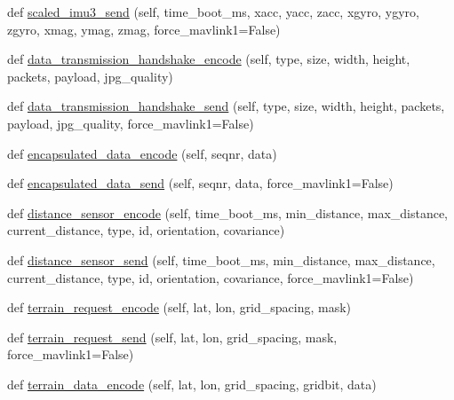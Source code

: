 \begin{DoxyCompactItemize}
\item 
def \hyperlink{classpymavlink_1_1dialects_1_1v10_1_1MAVLink_a28894d493bf265c31ad3fb4b7be9fd78}{scaled\+\_\+imu3\+\_\+send} (self, time\+\_\+boot\+\_\+ms, xacc, yacc, zacc, xgyro, ygyro, zgyro, xmag, ymag, zmag, force\+\_\+mavlink1=False)
\item 
def \hyperlink{classpymavlink_1_1dialects_1_1v10_1_1MAVLink_a57a74e2dec63d844409f787d2d19f21d}{data\+\_\+transmission\+\_\+handshake\+\_\+encode} (self, type, size, width, height, packets, payload, jpg\+\_\+quality)
\item 
def \hyperlink{classpymavlink_1_1dialects_1_1v10_1_1MAVLink_ac53be48c97d9cd12e5d0b5b6d0b3bd8c}{data\+\_\+transmission\+\_\+handshake\+\_\+send} (self, type, size, width, height, packets, payload, jpg\+\_\+quality, force\+\_\+mavlink1=False)
\item 
def \hyperlink{classpymavlink_1_1dialects_1_1v10_1_1MAVLink_aff22bd7ee21436f88799c514db1c822d}{encapsulated\+\_\+data\+\_\+encode} (self, seqnr, data)
\item 
def \hyperlink{classpymavlink_1_1dialects_1_1v10_1_1MAVLink_a99fe1be361bc1866b03f74dd20065b3f}{encapsulated\+\_\+data\+\_\+send} (self, seqnr, data, force\+\_\+mavlink1=False)
\item 
def \hyperlink{classpymavlink_1_1dialects_1_1v10_1_1MAVLink_a2a2c3b17c85a3d0117698b342ae0598a}{distance\+\_\+sensor\+\_\+encode} (self, time\+\_\+boot\+\_\+ms, min\+\_\+distance, max\+\_\+distance, current\+\_\+distance, type, id, orientation, covariance)
\item 
def \hyperlink{classpymavlink_1_1dialects_1_1v10_1_1MAVLink_a4e848deb886640b622cc4d489f691059}{distance\+\_\+sensor\+\_\+send} (self, time\+\_\+boot\+\_\+ms, min\+\_\+distance, max\+\_\+distance, current\+\_\+distance, type, id, orientation, covariance, force\+\_\+mavlink1=False)
\item 
def \hyperlink{classpymavlink_1_1dialects_1_1v10_1_1MAVLink_af9baf8ee9391ad618e72ff17912f824a}{terrain\+\_\+request\+\_\+encode} (self, lat, lon, grid\+\_\+spacing, mask)
\item 
def \hyperlink{classpymavlink_1_1dialects_1_1v10_1_1MAVLink_a422b8160f09acfac224af58739ea1f11}{terrain\+\_\+request\+\_\+send} (self, lat, lon, grid\+\_\+spacing, mask, force\+\_\+mavlink1=False)
\item 
def \hyperlink{classpymavlink_1_1dialects_1_1v10_1_1MAVLink_abd4f1275b4bf234fe75cc1ae40e63e6a}{terrain\+\_\+data\+\_\+encode} (self, lat, lon, grid\+\_\+spacing, gridbit, data)
\item 

\end{DoxyCompactItemize}

